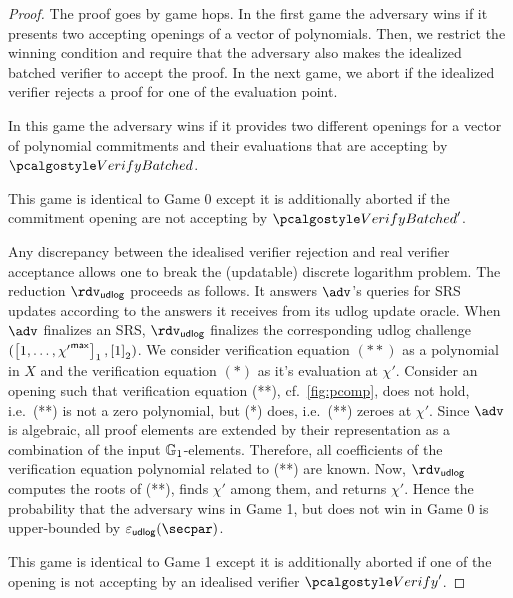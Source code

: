 \begin{proof}
 
  The proof goes by game hops. In the first game the adversary wins if it presents two accepting openings of a vector of polynomials. Then, we restrict the winning condition and require that the adversary also makes the idealized batched verifier to accept the proof. In the next game, we abort if the idealized verifier rejects a proof for one of the evaluation point. 

   In this game the adversary wins if it provides two different openings for a vector of polynomial commitments and their evaluations that are accepting by $\verifyb$.

   This game is identical to Game 0 except it is additionally aborted if the commitment opening are not accepting by $\verifyb'$.

  Any discrepancy between the idealised verifier rejection and real verifier acceptance allows one to break the (updatable) discrete logarithm problem.  The reduction $\rdvdulog$ proceeds as follows. It answers $\adv$'s queries for SRS updates according to the answers it receives from its udlog update oracle. When $\adv$ finalizes an SRS, $\rdvdulog$ finalizes the corresponding udlog challenge $(\left[1, \ldots, {\chi'}^{\mathsf{max}}\right]_{1}, \left[1\right]_{2})$. We consider verification equation $(**)$ as a polynomial in $X$ and the verification equation $(*)$ as it's evaluation at $\chi'$. Consider an opening such that verification equation (**), cf.~\cref{fig:pcomp}, does not hold, i.e.~(**) is not a zero polynomial, but (*) does, i.e.~(**) zeroes at $\chi'$. Since $\adv$ is algebraic, all proof elements are extended by their representation as a combination of the input $\mathbb{G}_1$-elements. Therefore, all coefficients of the verification equation polynomial related to (**) are known. Now, $\rdvdulog$ computes the roots of (**), finds $\chi'$ among them, and returns $\chi'$. Hence the probability that the adversary wins in Game 1, but does not win in Game 0 is upper-bounded by $\epsudlog (\secpar)$.

   This game is identical to Game 1 except it is additionally aborted if one of the opening is not accepting by an idealised verifier $\verify'$.


\end{proof}

